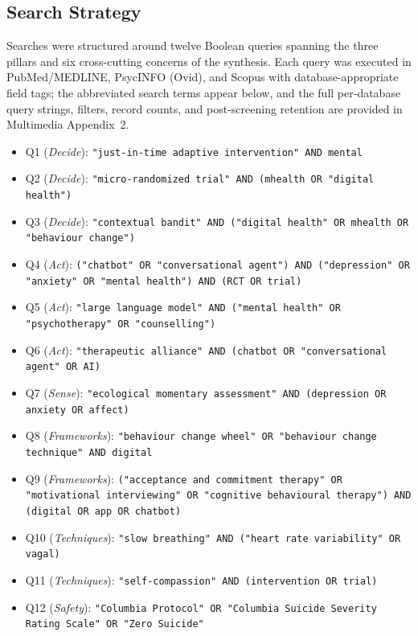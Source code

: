 \documentclass[11pt,a4paper]{article}
\begin{document}
\subsection{Search Strategy}\label{sec:search}

Searches were structured around twelve Boolean queries spanning the
three pillars and six cross-cutting concerns of the synthesis. Each
query was executed in PubMed/MEDLINE, PsycINFO (Ovid), and Scopus
with database-appropriate field tags; the abbreviated search terms
appear below, and the full per-database query strings, filters,
record counts, and post-screening retention are provided in
Multimedia Appendix~2.

\begin{itemize}\setlength{\itemsep}{0pt}
  \item Q1 (\emph{Decide}): \texttt{"just-in-time adaptive intervention" AND mental}
  \item Q2 (\emph{Decide}): \texttt{"micro-randomized trial" AND (mhealth OR "digital health")}
  \item Q3 (\emph{Decide}): \texttt{"contextual bandit" AND ("digital health" OR mhealth OR "behaviour change")}
  \item Q4 (\emph{Act}): \texttt{("chatbot" OR "conversational agent") AND ("depression" OR "anxiety" OR "mental health") AND (RCT OR trial)}
  \item Q5 (\emph{Act}): \texttt{"large language model" AND ("mental health" OR "psychotherapy" OR "counselling")}
  \item Q6 (\emph{Act}): \texttt{"therapeutic alliance" AND (chatbot OR "conversational agent" OR AI)}
  \item Q7 (\emph{Sense}): \texttt{"ecological momentary assessment" AND (depression OR anxiety OR affect)}
  \item Q8 (\emph{Frameworks}): \texttt{"behaviour change wheel" OR "behaviour change technique" AND digital}
  \item Q9 (\emph{Frameworks}): \texttt{("acceptance and commitment therapy" OR "motivational interviewing" OR "cognitive behavioural therapy") AND (digital OR app OR chatbot)}
  \item Q10 (\emph{Techniques}): \texttt{"slow breathing" AND ("heart rate variability" OR vagal)}
  \item Q11 (\emph{Techniques}): \texttt{"self-compassion" AND (intervention OR trial)}
  \item Q12 (\emph{Safety}): \texttt{"Columbia Protocol" OR "Columbia Suicide Severity Rating Scale" OR "Zero Suicide"}
\end{itemize}
\end{document}
